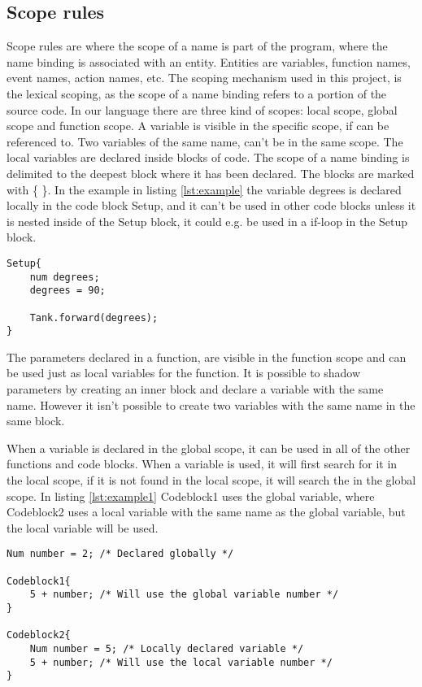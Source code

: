 \subsection{Scope rules}
Scope rules are where the scope of a name is part of the program, where the name binding is associated with an entity. Entities are variables, function names, event names, action names, etc. The scoping mechanism used in this project, is the lexical scoping, as the scope of a name binding refers to a portion of the source code. In our language there are three kind of scopes: local scope, global scope and function scope. A variable is visible in the specific scope, if can be referenced to. Two variables of the same name, can't be in the same scope. The local variables are declared inside blocks of code. The scope of a name binding is delimited to the deepest block where it has been declared. The blocks are marked with \{ \}. In the example in listing \ref{lst:example} the variable degrees is declared locally in the code block Setup, and it can't be used in other code blocks unless it is nested inside of the Setup block, it could e.g. be used in a if-loop in the Setup block. 

\begin{lstlisting}[caption={Example of local scoping rules},  xleftmargin=.2\textwidth, label={lst:example}]
Setup{
	num degrees;
	degrees = 90;
	
	Tank.forward(degrees);
}
\end{lstlisting}

The parameters declared in a function, are visible in the function scope and can be used just as local variables for the function. It is possible to shadow parameters by creating an inner block and declare a variable with the same name. However it isn't possible to create two variables with the same name in the same block. 

When a variable is declared in the global scope, it can be used in all of the other functions and code blocks. When a variable is used, it will first search for it in the local scope, if it is not found in the local scope, it will search the in the global scope. In listing \ref{lst:example1} Codeblock1 uses the global variable, where Codeblock2 uses a local variable with the same name as the global variable, but the local variable will be used.


\begin{lstlisting}[caption={Example of global scoping rules},  xleftmargin=.2\textwidth, label={lst:example1}]
Num number = 2; /* Declared globally */

Codeblock1{
	5 + number; /* Will use the global variable number */
}

Codeblock2{
	Num number = 5; /* Locally declared variable */
	5 + number; /* Will use the local variable number */
}
\end{lstlisting}
